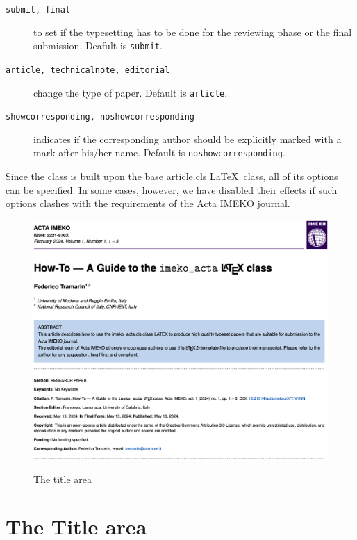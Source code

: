 \documentclass[11pt,onecolumn,notitlepage]{article}
\def\file#1{\textsf{\fontsize{9.2}{9.5}\selectfont\color{MidnightBlue}#1}\xspace}
\begin{document}
\begin{description}
\item [{\tt submit, final}]  to set if the typesetting has to be done for the reviewing phase or the final submission. Deafult is \verb|submit|.


\item [{\tt article, technicalnote, editorial}]  change the type of paper. Default is \verb|article|.

\item [{\tt showcorresponding, noshowcorresponding}] indicates if the corresponding author should be explicitly marked with a mark after his/her name. Default is \verb|noshowcorresponding|.

\end{description}

Since the class is built upon the base \file{article.cls} \LaTeX\ class, all of its options can be specified. In some cases, however, we have disabled their effects if such options clashes with the requirements of the Acta IMEKO journal.

\begin{figure}
\centering
\includegraphics[width=.85\textwidth]{titlearea.png}
\label{fig:titlearea}
\caption{The title area}
\end{figure}

\section{The Title area}
\end{document}
